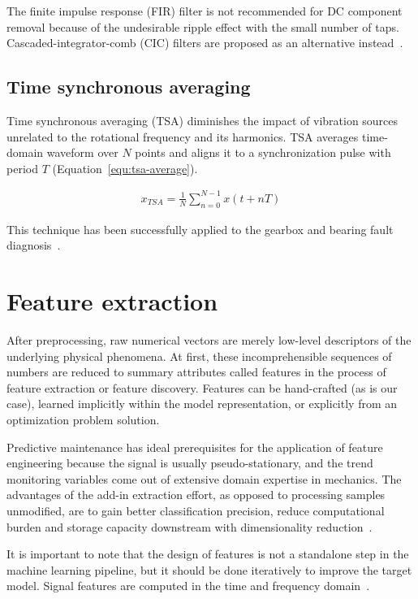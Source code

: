 The finite impulse response (FIR) filter is not recommended for DC component removal because of the undesirable ripple effect with the small number of taps. Cascaded-integrator-comb (CIC) filters are proposed as an alternative instead~\cite{lyons_understanding_2011}.

\subsection{Time synchronous averaging}
Time synchronous averaging (TSA) diminishes the impact of vibration sources unrelated to the rotational frequency and its harmonics. TSA averages time-domain waveform over $N$ points and aligns it to a synchronization pulse with period $T$ (Equation~\ref{equ:tsa-average}). 

\begin{ceqn}\begin{align}
x_{TSA} = \frac{1}{N} \sum_{n = 0}^{N - 1}{x(t + nT)}
\label{equ:tsa-average}
\end{align}\end{ceqn} 

This technique has been successfully applied to the gearbox and bearing fault diagnosis~\cite{davies_handbook_2012,nandi_condition_2019}.

\section{Feature extraction} \label{section:feature-extraction}
After preprocessing, raw numerical vectors are merely low-level descriptors of the underlying physical phenomena. At first, these incomprehensible sequences of numbers are reduced to summary attributes called features in the process of feature extraction or feature discovery. Features can be hand-crafted (as is our case), learned implicitly within the model representation, or explicitly from an optimization problem solution. 

Predictive maintenance has ideal prerequisites for the application of feature engineering because the signal is usually pseudo-stationary, and the trend monitoring variables come out of extensive domain expertise in mechanics. The advantages of the add-in extraction effort, as opposed to processing samples unmodified, are to gain better classification precision, reduce computational burden and storage capacity downstream with dimensionality reduction~\cite{johnson_feature_2019}. 

It is important to note that the design of features is not a standalone step in the machine learning pipeline, but it should be done iteratively to improve the target model. Signal features are computed in the time and frequency domain~\cite{brito_fault_2021}.

